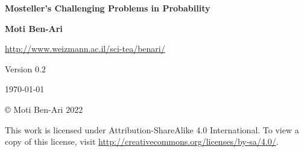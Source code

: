 

\thispagestyle{empty}

\begin{center}
\textbf{\LARGE Mosteller's Challenging Problems in Probability}

\bigskip
\bigskip
\bigskip

\textbf{\Large Moti Ben-Ari}

\bigskip

\url{http://www.weizmann.ac.il/sci-tea/benari/}

\bigskip
\bigskip
\bigskip

Version $0.2$

\bigskip

\today

\end{center}

\vfill

\begin{center}
\copyright{} Moti Ben-Ari $2022$
 \end{center}
 
\begin{small}
This work is licensed under Attribution-ShareAlike 4.0 International. To view a copy of this license, visit \url{http://creativecommons.org/licenses/by-sa/4.0/}.

%
%
%
%
%
%
\end{small}
\newpage

\tableofcontents

\newpage

